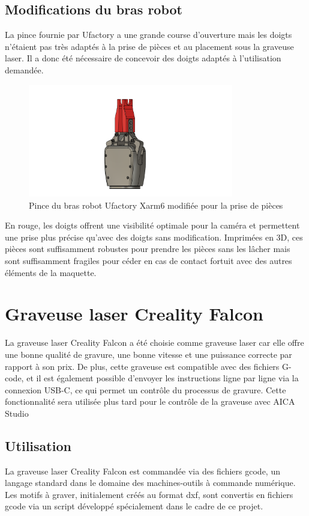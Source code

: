 \subsection{Modifications du bras robot}
La pince fournie par Ufactory a une grande course d'ouverture mais les doigts n'étaient pas très adaptés à la prise de pièces et au placement sous la graveuse laser. Il a donc été nécessaire de concevoir des doigts adaptés à l'utilisation demandée.
\begin{figure}[H]
    \centering
    \includegraphics[width=0.8\textwidth]{assets/figures/Pince_Xarm6.png}
    \caption{Pince du bras robot Ufactory Xarm6 modifiée pour la prise de pièces}
    \label{fig:pince_robot}
\end{figure}

En rouge, les doigts offrent une visibilité optimale pour la caméra et permettent une prise plus précise qu'avec des doigts sans modification. Imprimées en 3D, ces pièces sont suffisamment robustes pour prendre les pièces sans les lâcher mais sont suffisamment fragiles pour céder en cas de contact fortuit avec des autres éléments de la maquette.

\section{Graveuse laser Creality Falcon}

La graveuse laser Creality Falcon a été choisie comme graveuse laser car elle offre une bonne qualité de gravure, une bonne vitesse et une puissance correcte par rapport à son prix. De plus, cette graveuse est compatible avec des fichiers G-code, et il est également possible d'envoyer les instructions ligne par ligne via la connexion USB-C, ce qui permet un contrôle du processus de gravure. Cette fonctionnalité sera utilisée plus tard pour le contrôle de la graveuse avec AICA Studio

\subsection{Utilisation}
La graveuse laser Creality Falcon est commandée via des fichiers \gls{gcode}, un langage standard dans le domaine des machines-outils à commande numérique. Les motifs à graver, initialement créés au format \gls{dxf}, sont convertis en fichiers \gls{gcode} via un script développé spécialement dans le cadre de ce projet.

